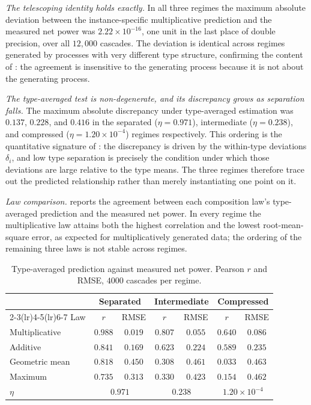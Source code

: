 \documentclass[11pt,a4paper]{article}
\theoremstyle{thmstyle}
\theoremstyle{definition}
\theoremstyle{remark}
\begin{document}
\emph{The telescoping identity holds exactly.} In all three regimes the
maximum absolute deviation between the instance-specific multiplicative
prediction and the measured net power was $2.22\times10^{-16}$, one unit in
the last place of double precision, over all $12{,}000$ cascades. The
deviation is identical across regimes generated by processes with very
different type structure, confirming the content of
: the agreement is insensitive to the generating
process because it is not about the generating process.

\emph{The type-averaged test is non-degenerate, and its discrepancy grows as
separation falls.} The maximum absolute discrepancy under type-averaged
estimation was $0.137$, $0.228$, and $0.416$ in the separated
($\eta=0.971$), intermediate ($\eta=0.238$), and compressed
($\eta=1.20\times10^{-4}$) regimes respectively. This ordering is the
quantitative signature of : the discrepancy is driven by the
within-type deviations $\delta_i$, and low type separation is precisely the
condition under which those deviations are large relative to the type means.
The three regimes therefore trace out the predicted relationship rather than
merely instantiating one point on it.

\emph{Law comparison.}  reports the agreement between each
composition law's type-averaged prediction and the measured net power. In
every regime the multiplicative law attains both the highest correlation and
the lowest root-mean-square error, as expected for multiplicatively generated
data; the ordering of the remaining three laws is not stable across regimes.

\begin{table}[H]
\centering
\caption{Type-averaged prediction against measured net power. Pearson $r$
and RMSE, $4000$ cascades per regime.}
\label{tab:laws}
\begin{tabular}{@{}lcccccc@{}}
\toprule
& \multicolumn{2}{c}{Separated} & \multicolumn{2}{c}{Intermediate}
& \multicolumn{2}{c}{Compressed}\\
\cmidrule(lr){2-3}\cmidrule(lr){4-5}\cmidrule(lr){6-7}
Law & $r$ & RMSE & $r$ & RMSE & $r$ & RMSE\\
\midrule
Multiplicative  & $0.988$ & $0.019$ & $0.807$ & $0.055$ & $0.640$ & $0.086$\\
Additive        & $0.841$ & $0.169$ & $0.623$ & $0.224$ & $0.589$ & $0.235$\\
Geometric mean  & $0.818$ & $0.450$ & $0.308$ & $0.461$ & $0.033$ & $0.463$\\
Maximum         & $0.735$ & $0.313$ & $0.330$ & $0.423$ & $0.154$ & $0.462$\\
\midrule
$\eta$ & \multicolumn{2}{c}{$0.971$} & \multicolumn{2}{c}{$0.238$}
& \multicolumn{2}{c}{$1.20\times10^{-4}$}\\
\bottomrule
\end{tabular}
\end{table}
\end{document}
